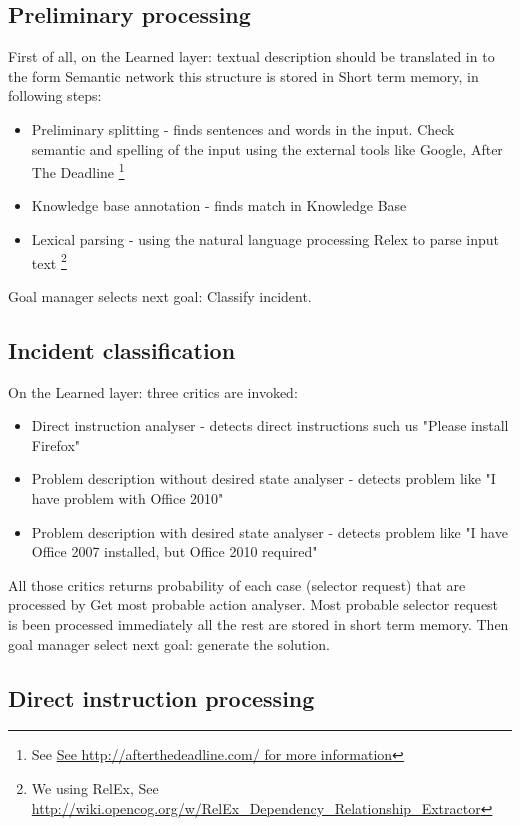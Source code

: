 \documentclass[conference]{IEEEtran}
\begin{document}
\subsection{Preliminary processing}

First of all, on the Learned layer: textual description should be translated in to the form Semantic network this structure is stored in Short term memory, in following steps:

\begin{itemize}
  \item Preliminary splitting - finds sentences and words in the input. Check semantic and spelling of the input using the external tools like Google, After The Deadline \footnote{See \url{See http://afterthedeadline.com/ for more information}}
  \item Knowledge base annotation - finds match in Knowledge Base
  \item Lexical parsing - using the natural language processing Relex to parse input text \footnote{We using RelEx, See \url{http://wiki.opencog.org/w/RelEx_Dependency_Relationship_Extractor}}
\end{itemize}

Goal manager selects next goal: Classify incident.

\subsection{Incident classification}

On the Learned layer: three critics are invoked:
\begin{itemize}
  \item Direct instruction analyser - detects direct instructions such us "Please install Firefox" 
  \item Problem description without desired state analyser - detects problem like "I have problem with Office 2010" 
  \item Problem description with desired state analyser - detects problem like "I have Office 2007 installed, but Office 2010 required"
\end{itemize}

All those critics returns probability of each case (selector request) that are processed by Get most probable action analyser. Most probable selector request is been processed immediately all the rest are stored in short term memory. Then goal manager select next goal: generate the solution.

\subsection{Direct instruction processing}
\end{document}
